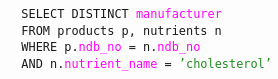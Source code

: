 \newcommand{\sqlcolor}[1]{\textcolor{Bittersweet}{#1}}
\newcommand{\fieldcolor}[1]{\textcolor{Fuchsia}{#1}}
\newcommand{\strcolor}[1]{\textcolor{ForestGreen}{#1}}

\begin{figure}[h]
    \texttt{
    \textcolor{white}{F}\sqlcolor{SELECT DISTINCT} \fieldcolor{manufacturer} \\
    \textcolor{white}{FF}\sqlcolor{FROM} products p, nutrients n\\
    \textcolor{white}{FF}\sqlcolor{WHERE} p.\fieldcolor{ndb\_no} = n.\fieldcolor{ndb\_no} \\ 
    \textcolor{white}{FF}\sqlcolor{AND} n.\fieldcolor{nutrient\_name} = \strcolor{'cholesterol'}
    }
\end{figure}

